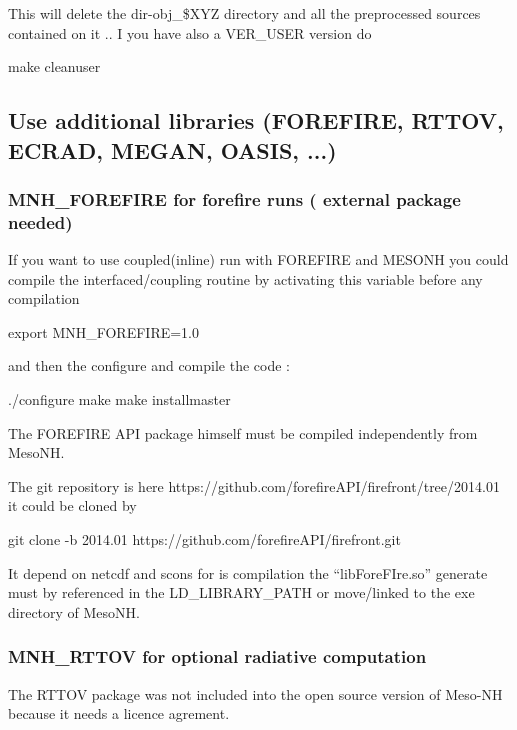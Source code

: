 This will delete the dir-obj\_\${XYZ} directory and all the preprocessed sources contained on it .. I you have also a VER\_USER version do
\begin{bashcode}
make cleanuser
\end{bashcode}

\subsection{Use additional libraries (FOREFIRE, RTTOV, ECRAD, MEGAN, OASIS, ...)}

\subsubsection{MNH\_FOREFIRE for forefire runs ( external package needed)}

If you want to use coupled(inline) run with FOREFIRE and MESONH you could compile the interfaced/coupling routine by activating this variable before any compilation
\begin{bashcode}
export MNH_FOREFIRE=1.0
\end{bashcode}
and then the configure and compile the code :
\begin{bashcode}
./configure
make
make installmaster
\end{bashcode}

The FOREFIRE API package himself must be compiled independently from MesoNH.

The git repository is here https://github.com/forefireAPI/firefront/tree/2014.01 it could be cloned by
\begin{bashcode}
git clone -b 2014.01 https://github.com/forefireAPI/firefront.git
\end{bashcode}

It depend on netcdf and scons for is compilation the ``libForeFIre.so'' generate must by referenced in the LD\_LIBRARY\_PATH or move/linked to the exe directory of MesoNH.

\subsubsection{MNH\_RTTOV for optional radiative computation}

The RTTOV package was not included into the open source version of Meso-NH because it needs a licence agrement.

